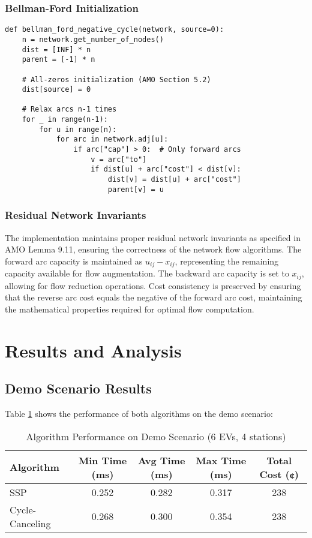 \documentclass[12pt,a4paper]{article}
\begin{document}
\subsubsection{Bellman-Ford Initialization}
\begin{lstlisting}[caption=Proper Bellman-Ford Implementation]
def bellman_ford_negative_cycle(network, source=0):
    n = network.get_number_of_nodes()
    dist = [INF] * n
    parent = [-1] * n
    
    # All-zeros initialization (AMO Section 5.2)
    dist[source] = 0
    
    # Relax arcs n-1 times
    for _ in range(n-1):
        for u in range(n):
            for arc in network.adj[u]:
                if arc["cap"] > 0:  # Only forward arcs
                    v = arc["to"]
                    if dist[u] + arc["cost"] < dist[v]:
                        dist[v] = dist[u] + arc["cost"]
                        parent[v] = u
\end{lstlisting}

\subsubsection{Residual Network Invariants}

The implementation maintains proper residual network invariants as specified in AMO Lemma 9.11, ensuring the correctness of the network flow algorithms. The forward arc capacity is maintained as $u_{ij} - x_{ij}$, representing the remaining capacity available for flow augmentation. The backward arc capacity is set to $x_{ij}$, allowing for flow reduction operations. Cost consistency is preserved by ensuring that the reverse arc cost equals the negative of the forward arc cost, maintaining the mathematical properties required for optimal flow computation.

\section{Results and Analysis}

\subsection{Demo Scenario Results}

Table \ref{tab:demo_results} shows the performance of both algorithms on the demo scenario:

\begin{table}[H]
\centering
\caption{Algorithm Performance on Demo Scenario (6 EVs, 4 stations)}
\label{tab:demo_results}
\begin{tabular}{@{}lcccc@{}}
\toprule
\textbf{Algorithm} & \textbf{Min Time (ms)} & \textbf{Avg Time (ms)} & \textbf{Max Time (ms)} & \textbf{Total Cost (¢)} \\
\midrule
SSP & 0.252 & 0.282 & 0.317 & 238 \\
Cycle-Canceling & 0.268 & 0.300 & 0.354 & 238 \\
\bottomrule
\end{tabular}
\end{table}
\end{document}
